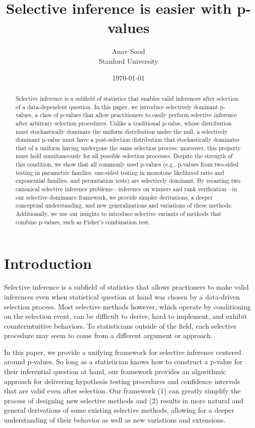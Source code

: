 \documentclass{article}
\title{Selective inference is easier with p-values}
\author{Anav Sood\\ Stanford University}
\date{\today}
\begin{document}
\maketitle

\begin{abstract}
Selective inference is a subfield of statistics that enables valid inferences after selection of a data-dependent question. In this paper, we introduce selectively dominant p-values, a class of p-values that allow practitioners to easily perform selective inference after arbitrary selection procedures. Unlike a traditional p-value, whose distribution must stochastically dominate the uniform distribution under the null, a selectively dominant p-value must have a  post-selection distribution that stochastically dominates that of a uniform having undergone the same selection process; moreover, this property must hold simultaneously for all possible selection processes. Despite the strength of this condition, we show that all commonly used p-values (e.g., p-values from two-sided testing in parametric families, one-sided testing in monotone likelihood ratio and exponential families, and permutation tests) are selectively dominant. By recasting two canonical selective inference problems—inference on winners and rank verification—in our selective dominance framework, we provide simpler derivations, a deeper conceptual understanding, and new generalizations and variations of these methods. Additionally, we use our insights to introduce selective variants of methods that combine p-values, such as Fisher's combination test. 
\end{abstract}


\section{Introduction}

Selective inference is a subfield of statistics that allows practioners to make valid inferences even when statistical question at hand was chosen by a data-driven selection process. Most selective methods however, which operate by conditioning on the selection event, can be difficult to derive, hard to implement, and exhibit counterintuitive behaviors. To statisticians outside of the field, each selective procedure may seem to come from a different argument or approach.


In this paper, we provide a unifying framework for selective inference centered around p-values. So long as a statistician knows how to construct a p-value for their inferential question at hand, our framework provides an algorithmic approach for delivering hypothesis testing procedures and confidence intervals that are valid even after selection. Our framework (1) can greatly simplify the process of designing new selective methods and (2) results in more natural and general derivations of some existing selective methods, allowing for a deeper understanding of their behavior as well as new variations and extensions. 
\end{document}
